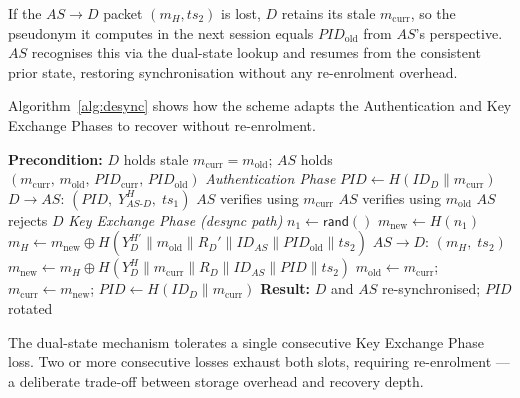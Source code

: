 \documentclass[12pt,a4paper]{report}
\begin{document}
If the $AS \to D$ packet $(m_H, ts_2)$ is lost, $D$ retains its stale
$m_{\mathrm{curr}}$, so the pseudonym it computes in the next session equals
$\mathit{PID}_{\mathrm{old}}$ from $AS$'s perspective.
$AS$ recognises this via the dual-state lookup and resumes from the consistent prior
state, restoring synchronisation without any re-enrolment overhead.

Algorithm~\ref{alg:desync} shows how the scheme adapts the Authentication and Key
Exchange Phases to recover without re-enrolment.

\begin{algorithm}[!ht]
\caption{Desynchronisation Recovery}
\label{alg:desync}
\begin{algorithmic}[1]
\Statex \textbf{Precondition:} $D$ holds stale $m_{\mathrm{curr}} = m_{\mathrm{old}}$;\;
       $AS$ holds $(m_{\mathrm{curr}},\,m_{\mathrm{old}},\,
       \mathit{PID}_{\mathrm{curr}},\,\mathit{PID}_{\mathrm{old}})$
\Statex
\Statex \textit{Authentication Phase}
\State $\mathit{PID} \gets H(\mathit{ID}_D \| m_{\mathrm{curr}})$
       \hfill{}
\State $D \to AS$: $(\mathit{PID},\; Y_{AS\text{-}D}^H,\; ts_1)$
    \State $AS$ verifies using $m_{\mathrm{curr}}$ \hfill{}
    \State $AS$ verifies using $m_{\mathrm{old}}$ \hfill{}
\Else
    \State $AS$ rejects $D$
\EndIf
\Statex
\Statex \textit{Key Exchange Phase (desync path)}
\State $n_1 \gets \mathsf{rand}()$
\State $m_{\mathrm{new}} \gets H(n_1)$
\State $m_H \gets m_{\mathrm{new}} \oplus
       H\!\left(Y_D^{H'} \| m_{\mathrm{old}} \| R_D' \|
       \mathit{ID}_{AS} \| \mathit{PID}_{\mathrm{old}} \| ts_2\right)$
\State $AS \to D$: $(m_H,\; ts_2)$
\State $m_{\mathrm{new}} \gets m_H \oplus
       H\!\left(Y_D^{H} \| m_{\mathrm{curr}} \| R_D \|
       \mathit{ID}_{AS} \| \mathit{PID} \| ts_2\right)$
       \hfill{}
\State $m_{\mathrm{old}} \gets m_{\mathrm{curr}}$;\quad
       $m_{\mathrm{curr}} \gets m_{\mathrm{new}}$;\quad
       $\mathit{PID} \gets H(\mathit{ID}_D \| m_{\mathrm{curr}})$
\Statex \textbf{Result:} $D$ and $AS$ re-synchronised; $\mathit{PID}$ rotated
\end{algorithmic}
\end{algorithm}

The dual-state mechanism tolerates a single consecutive Key Exchange Phase loss.
Two or more consecutive losses exhaust both slots, requiring re-enrolment — a
deliberate trade-off between storage overhead and recovery depth.
\end{document}

